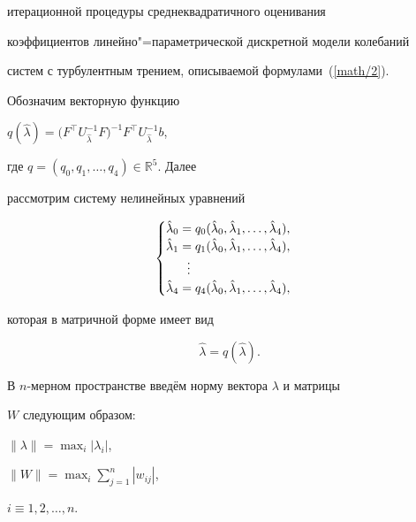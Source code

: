 итерационной процедуры среднеквадратичного оценивания

коэффициентов линейно"=параметрической дискретной модели колебаний

систем с турбулентным трением,  описываемой формулами~(\ref{math/2}).



Обозначим векторную функцию

$q( \hat{\lambda} ) = \bigl( F^{\top}U^{-1}_{\hat{\lambda}}F \bigr) ^{-1}F^{\top}U^{-1}_{\hat{\lambda}}b$, 

где  $q=( q_{0}, q_{1}, \ldots, q_{4} ) \in \mathbb R^5$. Далее

рассмотрим систему нелинейных уравнений

$$

        \begin{cases}

            \hat{\lambda}_{0}=q_{0}( \hat{\lambda}_{0}, \hat{\lambda}_{1}, \ldots, \hat{\lambda}_{4} ) , \\

            \hat{\lambda}_{1}=q_{1}( \hat{\lambda}_{0}, \hat{\lambda}_{1}, \ldots, \hat{\lambda}_{4} ) , \\

            \hspace{.6cm}\vdots \\

            \hat{\lambda}_{4}=q_{4}( \hat{\lambda}_{0}, \hat{\lambda}_{1}, \ldots, \hat{\lambda}_{4} ) , 

        \end{cases}

 $$

 которая в матричной форме имеет вид

\begin{equation}

    \label{math/3}

    \hat{\lambda}=q( \hat{\lambda} ) .

\end{equation}





В $n$-мерном пространстве введём норму вектора $\lambda$ и матрицы

$W$ следующим образом:

$\|\lambda\|=\max_i |\lambda_{i}|$, 

$\|W\|=\max_i \sum_{j=1}^{n}|w_{ij}|$, 

$i\equiv 1, 2, \ldots, n$.



